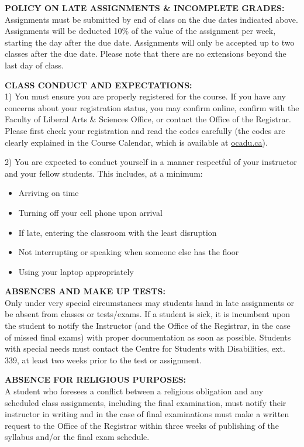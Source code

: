 \documentclass[10pt]{article}
\begin{document}
\textbf{POLICY ON LATE ASSIGNMENTS \& INCOMPLETE GRADES:}\\
Assignments must be submitted by end of class on the due dates indicated above. Assignments will be deducted 10\% of the value of the assignment per week, starting the day after the due date. Assignments will only be accepted up to two classes after the due date. Please note that there are no extensions beyond the last day of class.

\textbf{CLASS CONDUCT AND EXPECTATIONS:}\\
1) You must ensure you are properly registered for the course. If you have any concerns about your registration status, you may confirm online, confirm with the Faculty of Liberal Arts \& Sciences Office, or contact the Office of the Registrar. Please first check your registration and read the codes carefully (the codes are clearly explained in the Course Calendar, which is available at \href{http://www.ocadu.ca/services/records-and-registration/course-calendar-and-registration.htm}{ocadu.ca}).

2) You are expected to conduct yourself in a manner respectful of your instructor and your fellow students. This includes, at a minimum:
\begin{itemize}[noitemsep,topsep=0pt]
	\item Arriving on time
	\item Turning off your cell phone upon arrival
	\item If late, entering the classroom with the least disruption
	\item Not interrupting or speaking when someone else has the floor
	\item Using your laptop appropriately
\end{itemize}

\textbf{ABSENCES AND MAKE UP TESTS:}\\
Only under very special circumstances may students hand in late assignments or be absent from classes or tests/exams. If a student is sick, it is incumbent upon the student to notify the Instructor (and the Office of the Registrar, in the case of missed final exams) with proper documentation as soon as possible.  Students with special needs must contact the Centre for Students with Disabilities, ext. 339, at least two weeks prior to the test or assignment.

\textbf{ABSENCE FOR RELIGIOUS PURPOSES:}\\
A student who foresees a conflict between a religious obligation and any scheduled class assignments, including the final examination, must notify their instructor in writing and in the case of final examinations must make a written request to the Office of the Registrar within three weeks of publishing of the syllabus and/or the final exam schedule. 
\end{document}

